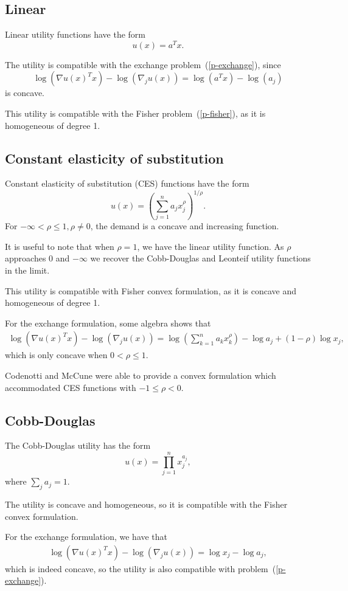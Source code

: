 \documentclass[12pt]{article}
\begin{document}
\subsection{Linear}

Linear utility functions have the form
\[
u(x) = a^T x.
\]

The utility is compatible with the exchange problem~(\ref{p-exchange}),
since
\[
\log(\nabla u(x)^T x) - \log(\nabla_j u(x))  = \log(a^T x) - \log(a_j)
\]
is concave.

This utility is compatible with the Fisher problem~(\ref{p-fisher}), as it is homogeneous of degree 1.


\subsection{Constant elasticity of substitution}
Constant elasticity of substitution (CES) functions have the form
\[
u(x) = \left(\sum_{j=1}^n a_j x_j^\rho \right)^{1/\rho}.
\]
For $-\infty < \rho \leq 1, \rho \neq 0$, the demand is a concave and
increasing function.

It is useful to note that when $\rho = 1$, we have the linear utility function. As $\rho$ approaches $0$ and $-\infty$ we recover the Cobb-Douglas and Leonteif
utility functions in the limit. %

This utility is compatible with Fisher convex formulation, as it is concave and homogeneous of degree 1.

For the exchange formulation, some algebra shows that 
\begin{align*}
\log(\nabla u(x)^T x) - \log(\nabla_j u(x)) =
\log\left(\sum_{k=1}^n a_k x_k^\rho \right) - \log a_j + (1-\rho) \log x_j,
\end{align*}
which is only concave when $0 < \rho \leq 1$.

Codenotti and McCune \cite{codenotti2005marketCES} were able to provide a convex formulation which accommodated
CES functions with $-1 \leq \rho < 0$.

\subsection{Cobb-Douglas}
The Cobb-Douglas utility has the form
\[
u(x) = \prod_{j=1}^{n} x_j^{a_j},
\]
where $\sum_j a_j = 1$.


The utility is concave and homogeneous, so it is compatible with the Fisher
convex formulation.

For the exchange formulation, we have that
\begin{align*}
\log(\nabla u(x)^T x) - \log(\nabla_j u(x)) =
\log x_j - \log a_j,
\end{align*}
which is indeed concave, so the utility is also compatible with
problem~(\ref{p-exchange}).
\end{document}
